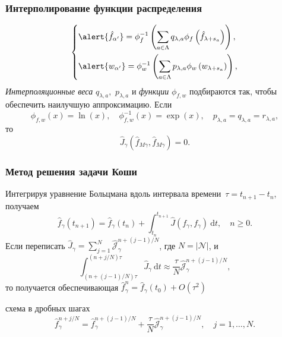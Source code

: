 \documentclass[mathserif]{beamer} %
\newcommand{\dd}{\:\mathrm{d}}
\newcommand{\Nu}{\mathcal{N}}
\newcommand{\OO}[1]{O(#1)}
\begin{document}
\begin{frame}
    \frametitle{Интерполирование функции распределения}
    \begin{equation}\label{eq:Kolmogorov_mean}
        \begin{dcases}
            \alert{\hat{f}_{\alpha'}} = \phi^{-1}_f\left(\sum_{a\in\Lambda} q_{\lambda,a}
                \phi_f\left(\hat{f}_{\lambda+s_a}\right)\right), \\
            \alert{w_{\alpha'}} = \phi^{-1}_w\left(\sum_{a\in\Lambda} p_{\lambda,a}
                \phi_w\left(w_{\lambda+s_a}\right)\right), \\
        \end{dcases}
    \end{equation}
    \emph{Интерполяционные веса} \(q_{\lambda,a},\) \(p_{\lambda,a}\) и \emph{функции} \(\phi_{f,w}\)
    подбираются так, чтобы обеспечить наилучшую аппроксимацию. Если
    \begin{equation}\label{eq:geometric_mean}
       \phi_{f,w}(x) = \ln(x), \quad \phi_{f,w}^{-1}(x) = \exp(x), \quad p_{\lambda,a} = q_{\lambda,a} = r_{\lambda,a},
    \end{equation}
    то
    \begin{equation}\label{eq:strict_interpolation}
        \hat{J}_\gamma(\hat{f}_{M\gamma}, \hat{f}_{M\gamma}) = 0.
    \end{equation}
\end{frame}

\begin{frame}
    \frametitle{Метод решения задачи Коши}
    Интегрируя уравнение Больцмана вдоль интервала времени~\(\tau = t_{n+1} - t_n\), получаем
    \begin{equation}\label{eq:time_scheme}
        \hat{f}_\gamma(t_{n+1}) = \hat{f}_\gamma(t_n) + \int_{t_n}^{t_{n+1}} \hat{J}(f_\gamma, f_\gamma) \dd{t},
        \quad n\ge0.
    \end{equation}
    Если переписать \(\hat{J}_{\gamma} = \sum_{j=1}^N \hat{\mathscr{J}}_{\gamma}^{n+(j-1)/N}\), где \(N=|\Nu|\), и
    \begin{equation}\label{eq:discrete_short_ci}
        \int_{(n+(j-1)/N)\tau}^{(n+j/N)\tau}\hat{J}_\gamma\dd{t} \approx
            \frac{\tau}{N} \hat{\mathscr{J}}_{\gamma}^{n+(j-1)/N},
    \end{equation}
    \pause
    то получается обеспечивающая \(\hat{f}_\gamma^n = \hat{f}_\gamma(t_0) + \OO{\tau^2}\)
    \begin{block}{схема в дробных шагах}
        \vspace{-5pt}
        \begin{equation}\label{eq:fractional_step_scheme}
            \hat{f}_\gamma^{n+j/N} = \hat{f}_\gamma^{n+(j-1)/N} + \frac{\tau}{N}\hat{\mathscr{J}}_{\gamma}^{n+(j-1)/N}, \quad
            j = 1,\dotsc,N.
        \end{equation}
        \vspace{-10pt}
    \end{block}
\end{frame}
\end{document}
